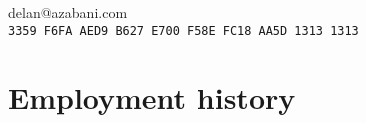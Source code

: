 \documentclass[a4paper,12pt]{article}
\begin{document}
\hrulefill

\hspace{1cm}\begin{minipage}{11cm}
	{\Huge delan\textcolor{lg}@azabani\textcolor{lg}{.com}}
	\vspace{0.5em}\\\textcolor{lg}{
	\texttt{3359 F6FA AED9 B627 E700 F58E FC18 AA5D 1313 1313}}
\end{minipage}\hfill\begin{minipage}{4cm}
\end{minipage}\hspace{1cm}

\hrulefill

\section*{Employment history}
\end{document}
